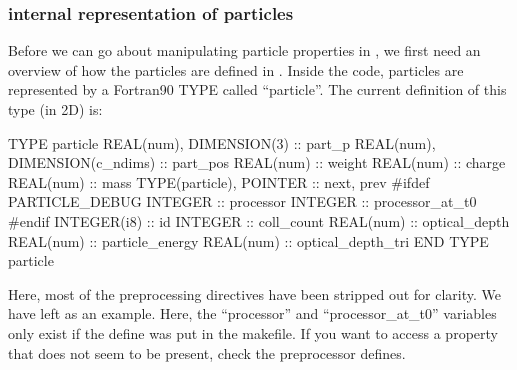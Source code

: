 \subsubsection{{\EPOCH} internal representation of particles}
\label{sec:partrep}
Before we can go about manipulating particle properties in
, we first need an overview of how the particles
are defined in {\EPOCH}.
Inside the code, particles are represented by a Fortran90 TYPE called
``particle''. The current definition of this type (in 2D) is:
\begin{boxverbatim}
  TYPE particle
    REAL(num), DIMENSION(3) :: part_p
    REAL(num), DIMENSION(c_ndims) :: part_pos
    REAL(num) :: weight
    REAL(num) :: charge
    REAL(num) :: mass
    TYPE(particle), POINTER :: next, prev
#ifdef PARTICLE_DEBUG
    INTEGER :: processor
    INTEGER :: processor_at_t0
#endif
    INTEGER(i8) :: id
    INTEGER :: coll_count
    REAL(num) :: optical_depth
    REAL(num) :: particle_energy
    REAL(num) :: optical_depth_tri
  END TYPE particle
\end{boxverbatim}
Here, most of the preprocessing directives have been stripped out for clarity.
We have left  as an example.
Here, the ``processor'' and ``processor\_at\_t0'' variables only exist if the
 define was put in
the makefile. If you want to access a property that does not seem to be
present, check the preprocessor defines.


